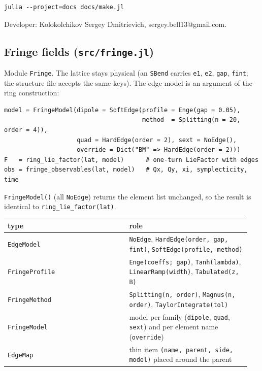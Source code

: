 \documentclass[11pt,a4paper]{article}
\begin{document}
\begin{verbatim}
julia --project=docs docs/make.jl
\end{verbatim}

Developer: Kolokolchikov Sergey Dmitrievich, sergey.bell13@gmail.com.

\subsection{Fringe fields (\texttt{src/fringe.jl})}

Module \texttt{Fringe}. The lattice stays physical (an \texttt{SBend} carries \texttt{e1}, \texttt{e2},
\texttt{gap}, \texttt{fint}; the structure file accepts the same keys). The edge model is
an argument of the ring construction:

\begin{verbatim}
model = FringeModel(dipole = SoftEdge(profile = Enge(gap = 0.05),
                                      method  = Splitting(n = 20, order = 4)),
                    quad = HardEdge(order = 2), sext = NoEdge(),
                    override = Dict("BM" => HardEdge(order = 2)))
F   = ring_lie_factor(lat, model)      # one-turn LieFactor with edges
obs = fringe_observables(lat, model)   # Qx, Qy, xi, symplecticity, time
\end{verbatim}

\texttt{FringeModel()} (all \texttt{NoEdge}) returns the element list unchanged, so the
result is identical to \texttt{ring\_lie\_factor(lat)}.

\begin{center}\small\begin{tabular}{p{0.475\linewidth}p{0.475\linewidth}}\hline
\textbf{type} & \textbf{role}\\\hline
\texttt{EdgeModel} & \texttt{NoEdge}, \texttt{HardEdge(order, gap, fint)}, \texttt{SoftEdge(profile, method)}\\
\texttt{FringeProfile} & \texttt{Enge(coeffs; gap)}, \texttt{Tanh(lambda)}, \texttt{LinearRamp(width)}, \texttt{Tabulated(z, B)}\\
\texttt{FringeMethod} & \texttt{Splitting(n, order)}, \texttt{Magnus(n, order)}, \texttt{TaylorIntegrate(tol)}\\
\texttt{FringeModel} & model per family (\texttt{dipole}, \texttt{quad}, \texttt{sext}) and per element name (\texttt{override})\\
\texttt{EdgeMap} & thin item \texttt{(name, parent, side, model)} placed around the parent\\
\hline\end{tabular}\end{center}
\end{document}
